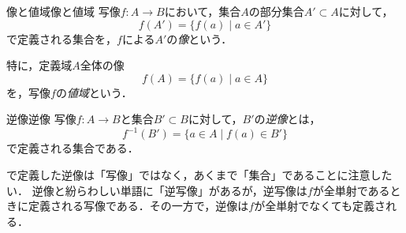 \begin{definition}{像と値域}{像と値域}
  写像$f \colon A \to B$において，集合$A$の部分集合$A' \subset A$に対して，
  \[
    f(A') = \{ f(a) \mid a \in A' \}
  \]
  で定義される集合を，$f$による$A'$の\emph{像}という．

  特に，定義域$A$全体の像
  \[
    f(A) = \{ f(a) \mid a \in A \}
  \]
  を，写像$f$の\emph{値域}という．

   
\end{definition}


\begin{definition}{逆像}{逆像}
  写像$f \colon A \to B$と集合$B' \subset B$に対して，$B'$の\emph{逆像}とは，
  \[
    f^{-1}(B') = \{ a \in A \mid f(a) \in B' \}
  \]
  で定義される集合である．

\end{definition}

\begin{remark}[逆像と逆写像]
  で定義した逆像は「写像」ではなく，あくまで「集合」であることに注意したい．
  逆像と紛らわしい単語に「逆写像」があるが，逆写像は$f$が全単射であるときに定義される写像である．その一方で，逆像は$f$が全単射でなくても定義される．
\end{remark}

